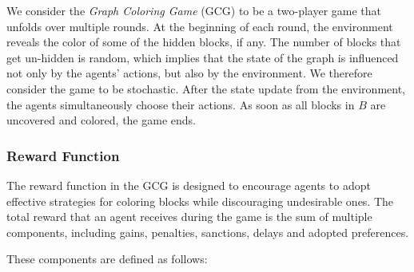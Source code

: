         \noindent
        We consider the \emph{Graph Coloring Game} (GCG) to be a two-player game that unfolds over multiple rounds. At the beginning of each round, the environment reveals the color of some of the hidden blocks, if any. The number of blocks that get un-hidden is random, which implies that the state of the graph is influenced not only by the agents' actions, but also by the environment. We therefore consider the game to be stochastic. After the state update from the environment, the agents simultaneously choose their actions. As soon as all blocks in $B$ are uncovered and colored, the game ends.

    \subsubsection{Reward Function}

        The reward function in the GCG is designed to encourage agents to adopt effective strategies for coloring blocks while discouraging undesirable ones. The total reward that an agent receives during the game is the sum of multiple components, including gains, penalties, sanctions, delays and adopted preferences.\tinydouble

        \noindent
        These components are defined as follows:

